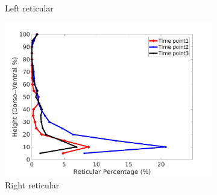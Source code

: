 \begin{figure}[H]
\begin{subfigure}{.42\linewidth}
  \caption{Left reticular}
  \label{fig:IPF6DiseaseDorsoToVentral-c} 
\end{subfigure} 
\begin{subfigure}{.42\linewidth}%
  \includegraphics[width=\linewidth,trim={{.0\wd0} {.0\wd0} {.0\wd0} {.0\wd0}},clip]{Appendix/Image_AppexA/DorsoToVentral/IPF6RightLungReticularDiseaseDorsoToVentral.jpg}
  \caption{Right reticular}
  \label{fig:IPF6DiseaseDorsoToVentral-d}
\end{subfigure}
\begin{subfigure}{.42\linewidth}%

\end{subfigure}
\end{figure}
